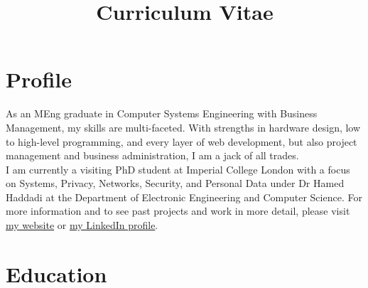 \documentclass[10pt,a4paper,sans]{moderncv} %
\title{Curriculum Vitae}
\begin{document}
\makecvtitle

\section{Profile}

\hspace*{15pt}
As an MEng graduate in Computer Systems Engineering with Business Management, my skills are multi-faceted. With strengths in hardware design, low to high-level programming, and every layer of web development, but also project management and business administration, I am a jack of all trades.
\\[5pt]
\hspace*{15pt}
I am currently a visiting PhD student at Imperial College London with a focus on Systems, Privacy, Networks, Security, and Personal Data under Dr Hamed Haddadi at the Department of Electronic Engineering and Computer Science. For more information and to see past projects and work in more detail, please visit \href{http://yousefamar.com}{my website} or \href{http://linkedin.com/in/yousefamar}{my LinkedIn profile}.


\vspace*{8pt}
\section{Education}
\end{document}
